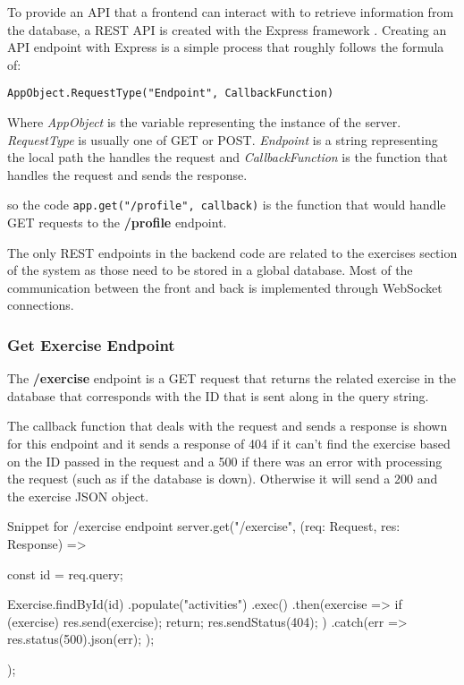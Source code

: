 To provide an API that a frontend can interact with to retrieve information from the database, a REST API is created with the Express framework \cite{express}. Creating an API endpoint with Express is a simple process that roughly follows the formula of:

\texttt{AppObject.RequestType("Endpoint", CallbackFunction)}

Where \textit{AppObject} is the variable representing the instance of the server. \textit{RequestType} is usually one of GET or POST. \textit{Endpoint} is a string representing the local path the handles the request and \textit{CallbackFunction} is the function that handles the request and sends the response.

so the code \texttt{app.get("/profile", callback)} is the function that would handle GET requests to the \textbf{/profile} endpoint. 

The only REST endpoints in the backend code are related to the exercises section of the system as those need to be stored in a global database. Most of the communication between the front and back is implemented through WebSocket connections.

\subsubsection{Get Exercise Endpoint}

The \textbf{/exercise} endpoint is a GET request that returns the related exercise in the database that corresponds with the ID that is sent along in the query string.

The callback function that deals with the request and sends a response is shown for this endpoint and it sends a response of 404 if it can't find the exercise based on the ID passed in the request and a 500 if there was an error with processing the request (such as if the database is down). Otherwise it will send a 200 and the exercise JSON object.

\begin{sexylisting}{Snippet for /exercise endpoint}
server.get("/exercise", (req: Request, res: Response) => {
    const { id } = req.query;

    Exercise.findById(id)
        .populate("activities")
        .exec()
        .then(exercise => {
            if (exercise) {
                res.send(exercise);
                return;
            }
            res.sendStatus(404);
        })
        .catch(err => {
            res.status(500).json(err);
        });
});
\end{sexylisting}

